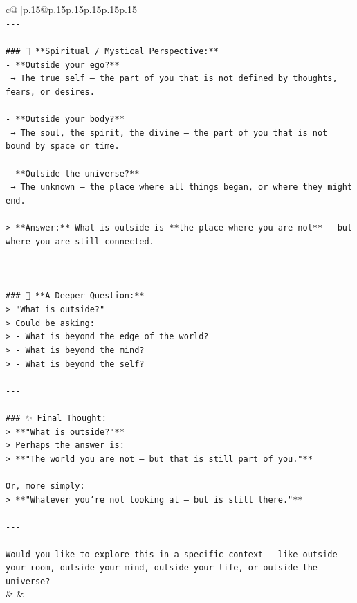 \documentclass{article}
\begin{document}
{\begin{supertabular}{c@{$\;$}|p{.15\linewidth}@{}p{.15\linewidth}p{.15\linewidth}p{.15\linewidth}p{.15\linewidth}p{.15\linewidth}}
{{{\\ 
\texttt{{-}{-}{-}} \\
\\ 
\texttt{\#\#\# 🧩 **Spiritual / Mystical Perspective:**} \\
\texttt{{-} **Outside your ego?**  } \\
\texttt{  → The true self — the part of you that is not defined by thoughts, fears, or desires.} \\
\\ 
\texttt{{-} **Outside your body?**  } \\
\texttt{  → The soul, the spirit, the divine — the part of you that is not bound by space or time.} \\
\\ 
\texttt{{-} **Outside the universe?**  } \\
\texttt{  → The unknown — the place where all things began, or where they might end.} \\
\\ 
\texttt{> **Answer:** What is outside is **the place where you are not** — but where you are still connected.} \\
\\ 
\texttt{{-}{-}{-}} \\
\\ 
\texttt{\#\#\# 🤔 **A Deeper Question:**} \\
\texttt{> "What is outside?"  } \\
\texttt{> Could be asking:  } \\
\texttt{> {-} What is beyond the edge of the world?  } \\
\texttt{> {-} What is beyond the mind?  } \\
\texttt{> {-} What is beyond the self?} \\
\\ 
\texttt{{-}{-}{-}} \\
\\ 
\texttt{\#\#\# ✨ Final Thought:} \\
\texttt{> **"What is outside?"**  } \\
\texttt{> Perhaps the answer is:  } \\
\texttt{> **"The world you are not — but that is still part of you."**} \\
\\ 
\texttt{Or, more simply:  } \\
\texttt{> **"Whatever you’re not looking at — but is still there."**} \\
\\ 
\texttt{{-}{-}{-}} \\
\\ 
\texttt{Would you like to explore this in a specific context — like outside your room, outside your mind, outside your life, or outside the universe?} \\
            }
        }
    }
    & & \\ \\


\end{supertabular}}
\end{document}
